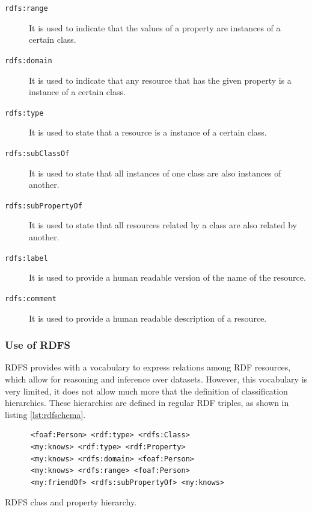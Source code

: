 \begin{description}

\item[\texttt{rdfs:range}] It is used to indicate that the values of a property are instances of a certain class.

\item[\texttt{rdfs:domain}] It is used to indicate that any resource that has the given property is a instance of a certain class.

\item[\texttt{rdfs:type}] It is used to state that a resource is a instance of a certain class.

\item[\texttt{rdfs:subClassOf}] It is used to state that all instances of one class are also instances of another.

\item[\texttt{rdfs:subPropertyOf}] It is used to state that all resources related by a class are also related by another.

\item[\texttt{rdfs:label}] It is used to provide a human readable version of the name of the resource.

\item[\texttt{rdfs:comment}] It is used to provide a human readable description of a resource.

\end{description}

\subsubsection*{Use of RDFS}

RDFS provides with a vocabulary to express relations among RDF resources, which allow for reasoning and inference over datasets. However, this vocabulary is very limited, it does not allow much more that the definition of classification hierarchies. These hierarchies are defined in regular RDF triples, as shown in listing \ref{lst:rdfschema}.

\begin{listing}[ht]\centering
  \begin{minipage}{.6\textwidth}
    \begin{verbatim}
      <foaf:Person> <rdf:type> <rdfs:Class> 
      <my:knows> <rdf:type> <rdf:Property>
      <my:knows> <rdfs:domain> <foaf:Person>
      <my:knows> <rdfs:range> <foaf:Person>
      <my:friendOf> <rdfs:subPropertyOf> <my:knows>
    \end{verbatim}
  \end{minipage}
  \caption{RDFS class and property hierarchy.}\label{lst:rdfschema}
\end{listing}


